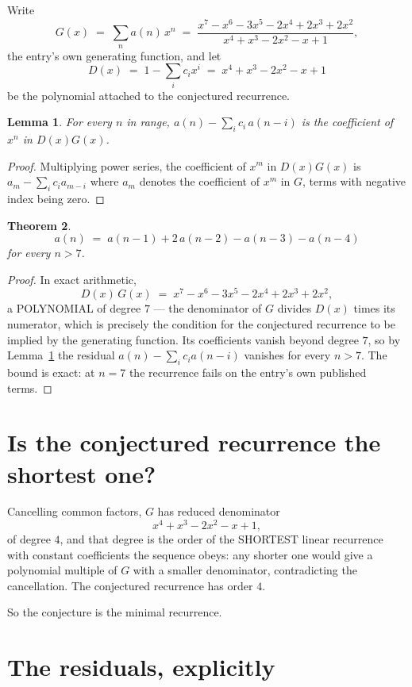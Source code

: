 \documentclass[11pt,a4paper]{article}
\theoremstyle{plain}
\newtheorem{theorem}{Theorem}
\newtheorem{lemma}[theorem]{Lemma}
\theoremstyle{definition}
\begin{document}
Write
\[
G(x)\;=\;\sum_{n}a(n)\,x^{n}\;=\;\frac{x^{7} - x^{6} - 3 x^{5} - 2 x^{4} + 2 x^{3} + 2 x^{2}}{x^{4} + x^{3} - 2 x^{2} - x + 1},
\]
the entry's own generating function, and let
\[
D(x)\;=\;1-\sum_i c_i x^{i}\;=\;x^{4} + x^{3} - 2 x^{2} - x + 1
\]
be the polynomial attached to the conjectured recurrence.

\begin{lemma}\label{lem:key}
For every $n$ in range, $a(n)-\sum_i c_i\,a(n-i)$ is the coefficient of $x^{n}$ in
$D(x)G(x)$.
\end{lemma}

\begin{proof}
Multiplying power series, the coefficient of $x^{m}$ in $D(x)G(x)$ is
$a_m-\sum_i c_i a_{m-i}$ where $a_m$ denotes the coefficient of $x^{m}$ in $G$, terms with
negative index being zero.
\end{proof}

\begin{theorem}
\[
a(n)\;=\;a(n-1) + 2\,a(n-2) - a(n-3) - a(n-4)
\]
for every $n>7$.
\end{theorem}

\begin{proof}
In exact arithmetic,
\[
D(x)\,G(x)\;=\;x^{7} - x^{6} - 3 x^{5} - 2 x^{4} + 2 x^{3} + 2 x^{2},
\]
a POLYNOMIAL of degree $7$ --- the denominator of $G$ divides $D(x)$ times its numerator,
which is precisely the condition for the conjectured recurrence to be implied by the
generating function. Its coefficients vanish beyond degree $7$, so by
Lemma~\ref{lem:key} the residual $a(n)-\sum_ic_ia(n-i)$ vanishes for every
$n>7$. The bound is exact: at $n=7$ the recurrence fails on the entry's own published terms.
\end{proof}

\section{Is the conjectured recurrence the shortest one?}

Cancelling common factors, $G$ has reduced denominator
\[
x^{4} + x^{3} - 2 x^{2} - x + 1,
\]
of degree $4$, and that degree is the order of the SHORTEST linear recurrence with
constant coefficients the sequence obeys: any shorter one would give a polynomial multiple of
$G$ with a smaller denominator, contradicting the cancellation. The conjectured recurrence has
order $4$.

So the conjecture is the minimal recurrence.

\section{The residuals, explicitly}
\end{document}

